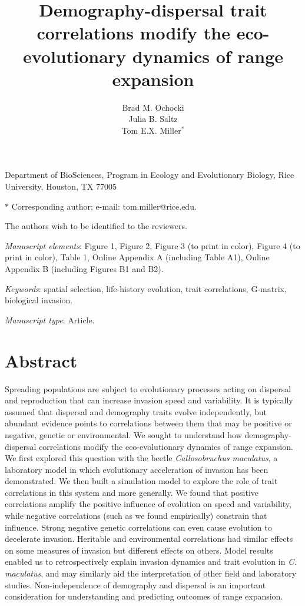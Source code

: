 \documentclass[11pt]{article}
\title{Demography-dispersal trait correlations modify the eco-evolutionary dynamics of range expansion}
\author{Brad M. Ochocki \\
Julia B. Saltz \\
Tom E.X. Miller$^{\ast}$}
\date{}
\begin{document}
\maketitle

\noindent{} Department of BioSciences, Program in Ecology and Evolutionary Biology, Rice University, Houston, TX 77005

\noindent{} $\ast$ Corresponding author; e-mail: tom.miller@rice.edu.

\bigskip

\noindent{} The authors wish to be identified to the reviewers.

\bigskip

\noindent{} \textit{Manuscript elements}: Figure 1, Figure 2, Figure 3 (to print in color), Figure 4 (to print in color), Table 1, Online Appendix A (including Table A1), Online Appendix B (including Figures B1 and B2).

\bigskip

\noindent{} \textit{Keywords}: spatial selection, life-history evolution, trait correlations, G-matrix, biological invasion.

\bigskip

\noindent{} \textit{Manuscript type}: Article.

\bigskip


\linenumbers{}
\modulolinenumbers[2]

\newpage{}

\section*{Abstract}
Spreading populations are subject to evolutionary processes acting on dispersal and reproduction that can increase invasion speed and variability. It is typically assumed that dispersal and demography traits evolve independently, but abundant evidence points to correlations between them that may be positive or negative, genetic or environmental. We sought to understand how demography-dispersal correlations modify the eco-evolutionary dynamics of range expansion. We first explored this question with the beetle \textit{Callosobruchus maculatus}, a laboratory model in which evolutionary acceleration of invasion has been demonstrated. We then built a simulation model to explore the role of trait correlations in this system and more generally. We found that positive correlations amplify the positive influence of evolution on speed and variability, while negative correlations (such as we found empirically) constrain that influence. Strong negative genetic correlations can even cause evolution to decelerate invasion. Heritable and environmental correlations had similar effects on some measures of invasion but different effects on others. Model results enabled us to retrospectively explain invasion dynamics and trait evolution in \textit{C. maculatus}, and may similarly aid the interpretation of other field and laboratory studies. Non-independence of demography and dispersal is an important consideration for understanding and predicting outcomes of range expansion.
\end{document}
